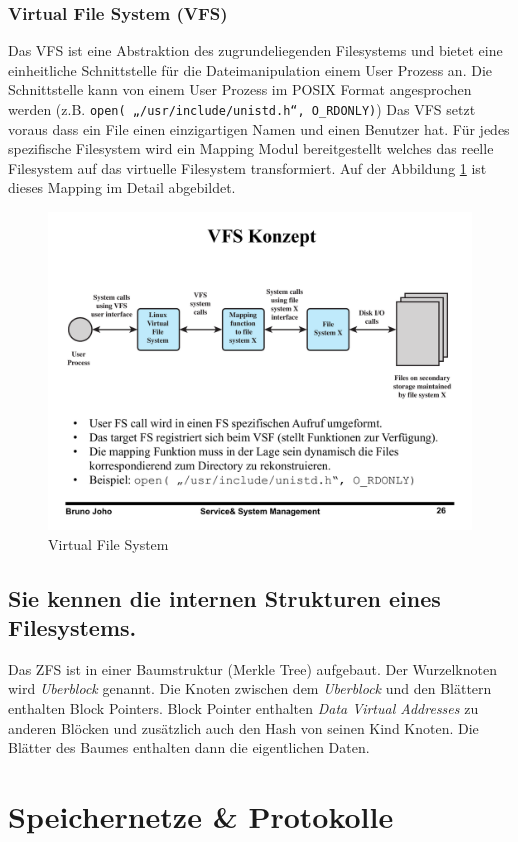
\subsubsection{Virtual File System (VFS)}

Das VFS ist eine Abstraktion des zugrundeliegenden Filesystems und bietet eine einheitliche Schnittstelle für die Dateimanipulation einem User Prozess an. Die Schnittstelle kann von einem User Prozess im POSIX Format angesprochen werden (z.B. \texttt{open( „/usr/include/unistd.h“, O\_RDONLY)}) Das VFS setzt voraus dass ein File einen einzigartigen Namen und einen Benutzer hat. Für jedes spezifische Filesystem wird ein Mapping Modul bereitgestellt welches das reelle Filesystem auf das virtuelle Filesystem transformiert. Auf der Abbildung \ref{fig:virtual-file-system} ist dieses Mapping im Detail abgebildet.

\begin{figure}
\centering
\includegraphics[width=0.7\linewidth]{fig/virtual-file-system}
\caption{Virtual File System}
\label{fig:virtual-file-system}
\end{figure}

\subsection{Sie kennen die internen Strukturen eines Filesystems.}

Das ZFS ist in einer Baumstruktur (Merkle Tree) aufgebaut. Der Wurzelknoten wird \emph{Uberblock} genannt. Die Knoten zwischen dem \emph{Uberblock} und den Blättern enthalten Block Pointers. Block Pointer enthalten \emph{Data Virtual Addresses} zu anderen Blöcken und zusätzlich auch den Hash von seinen Kind Knoten. Die Blätter des Baumes enthalten dann die eigentlichen Daten.

\section{Speichernetze \& Protokolle}